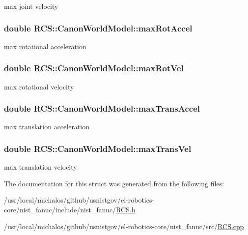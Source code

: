max joint velocity \hypertarget{structRCS_1_1CanonWorldModel_aca5f8ebce128e94ed4edf3caabb6c363}{
\subsubsection[{max\-Rot\-Accel}]{\setlength{\rightskip}{0pt plus 5cm}double R\-C\-S\-::\-Canon\-World\-Model\-::max\-Rot\-Accel}}\label{structRCS_1_1CanonWorldModel_aca5f8ebce128e94ed4edf3caabb6c363}
max rotational acceleration \hypertarget{structRCS_1_1CanonWorldModel_acbb472eee22bb4764dc865476fe56950}{
\subsubsection[{max\-Rot\-Vel}]{\setlength{\rightskip}{0pt plus 5cm}double R\-C\-S\-::\-Canon\-World\-Model\-::max\-Rot\-Vel}}\label{structRCS_1_1CanonWorldModel_acbb472eee22bb4764dc865476fe56950}
max rotational velocity \hypertarget{structRCS_1_1CanonWorldModel_a9b6d5469341e73289788ba0fe0f3c57a}{
\subsubsection[{max\-Trans\-Accel}]{\setlength{\rightskip}{0pt plus 5cm}double R\-C\-S\-::\-Canon\-World\-Model\-::max\-Trans\-Accel}}\label{structRCS_1_1CanonWorldModel_a9b6d5469341e73289788ba0fe0f3c57a}
max translation acceleration \hypertarget{structRCS_1_1CanonWorldModel_a55824e72d1d92c8b5f5c8ecf3b7c7a00}{
\subsubsection[{max\-Trans\-Vel}]{\setlength{\rightskip}{0pt plus 5cm}double R\-C\-S\-::\-Canon\-World\-Model\-::max\-Trans\-Vel}}\label{structRCS_1_1CanonWorldModel_a55824e72d1d92c8b5f5c8ecf3b7c7a00}
max translation velocity 

The documentation for this struct was generated from the following files\-:\begin{DoxyCompactItemize}
\item 
/usr/local/michalos/github/usnistgov/el-\/robotics-\/core/nist\-\_\-fanuc/include/nist\-\_\-fanuc/\hyperlink{RCS_8h}{R\-C\-S.\-h}\item 
/usr/local/michalos/github/usnistgov/el-\/robotics-\/core/nist\-\_\-fanuc/src/\hyperlink{RCS_8cpp}{R\-C\-S.\-cpp}\end{DoxyCompactItemize}

